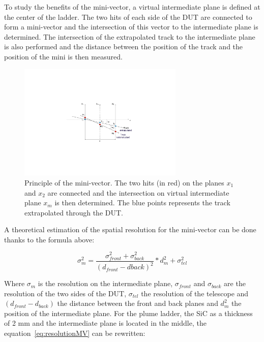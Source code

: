     To study the benefits of the mini-vector, a virtual intermediate plane is defined at the center of the ladder.
    The two hits of each side of the \gls{DUT} are connected to form a mini-vector and the intersection of this vector to the intermediate plane is determined.
    The intersection of the extrapolated track to the intermediate plane is also performed and the distance between the position of the track and the position of the mini is then measured.

    \begin{figure}[!h]
      \centering
      \includegraphics[width=0.7\textwidth]{Pictures/deformation/mini_vectors.pdf}
      \caption{Principle of the mini-vector. The two hits (in red) on the planes $x_1$ and $x_2$ are connected and the intersection on virtual intermediate plane $x_m$ is then determined. The blue points represents the track extrapolated through the DUT. }
      \label{fig:MV}
    \end{figure}

    A theoretical estimation of the spatial resolution for the mini-vector can be done thanks to the formula above:

    \begin{equation}
      \sigma_m^2 = \frac{\sigma_{front}^2 + \sigma_{back}^2}{(d_{front} - d{back})^2}*d_{m}^2 + \sigma_{tel}^2
      \label{eq:resolutionMV}
    \end{equation}

    Where $\sigma_m$ is the resolution on the intermediate plane, $\sigma_{front}$ and $\sigma_{back}$ are the resolution of the two sides of the \gls{DUT}, $\sigma_{tel}$ the resolution of the telescope and $(d_{front} - d_{back})$ the distance between the front and back planes and $d_{m}^2$ the position of the intermediate plane.
    For the plume ladder, the \gls{SiC} as a thickness of 2 mm and the intermediate plane is located in the middle, the equation~\ref{eq:resolutionMV} can be rewritten:

